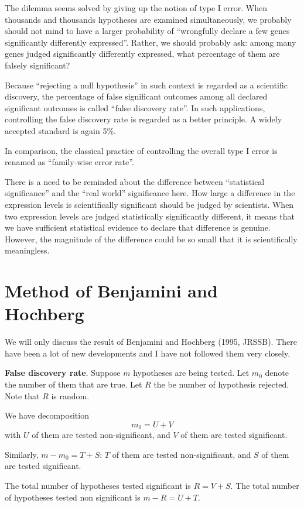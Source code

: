 The dilemma seems solved by giving up the notion of
type I error. When thousands and thousands hypotheses
are examined simultaneously, we probably should not
mind to have a larger probability of ``wrongfully declare a
few genes significantly differently expressed''.
Rather, we should probably ask: among many genes
judged significantly differently expressed, what percentage
of them are falsely significant?

Because ``rejecting a null hypothesis'' in such context is
regarded as a scientific discovery, the percentage
of false significant outcomes among all declared significant
outcomes is called ``false discovery rate''.
In such applications, controlling the false discovery rate
is regarded as a better principle. A widely accepted
standard is again 5\%.

In comparison, the classical practice of controlling
the overall type I error is renamed as ``family-wise
error rate''.

There is a need to be reminded about the
difference between ``statistical significance'' and the
``real world'' significance here. How large a difference
in the expression levels is scientifically significant should
be judged by scientists. When two expression levels
are judged statistically significantly different, it means
that we have sufficient statistical evidence to declare that
difference is genuine. However, the magnitude of
the difference could be so small that it is scientifically
meaningless. 

\section{Method of Benjamini and Hochberg}

We will only discuss the result of Benjamini and Hochberg
(1995, JRSSB). There have been a lot of new developments
and I have not followed them very closely.

\vs\noindent
{\bf False discovery rate}.
Suppose $m$ hypotheses are being tested.
Let $m_0$ denote the number of them that are true.
Let $R$ the be number of hypothesis rejected. Note that
$R$ is random.

We have decomposition
\[
m_0 = U + V
\]
with $U$ of them are tested non-significant, and $V$ of them
are tested significant.

Similarly, $m-m_0 = T + S$: $T$ of them are tested non-significant, 
and $S$ of them are tested significant.

The total number of hypotheses tested significant is $R = V + S$.
The total number of hypotheses tested non
significant is $m - R = U + T$.

